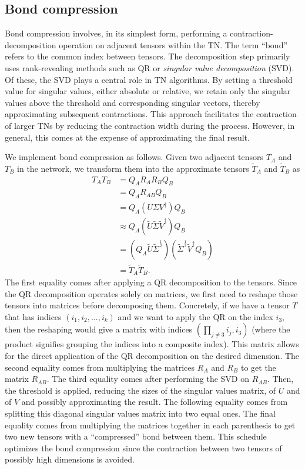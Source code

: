 \subsection{Bond compression}\label{Compression}
Bond compression involves, in its simplest form, performing a contraction-decomposition operation on adjacent tensors within the TN.
The term ``bond'' refers to the common index between tensors.
The decomposition step primarily uses rank-revealing methods such as QR or \textit{singular value decomposition} (SVD).
Of these, the SVD plays a central role in TN algorithms.
By setting a threshold value for singular values, either absolute or relative, we retain only the singular values above the threshold and corresponding singular vectors, thereby approximating subsequent contractions.
This approach facilitates the contraction of larger TNs by reducing the contraction width during the process.
However, in general, this comes at the expense of approximating the final result.

We implement bond compression as follows.
Given two adjacent tensors $T_A$ and $T_B$ in the network, we transform them into the approximate tensors $\tilde{T}_A$ and $\tilde{T}_B$ as
\begin{equation}\label{eq:compression_schedule}
    \begin{split}
        T_AT_B &= Q_AR_AR_BQ_B\\
        &= Q_AR_{AB}Q_B\\
        &= Q_A(U\Sigma V^\dagger)Q_B\\
        &\approx Q_A(\tilde{U}\tilde{\Sigma} \tilde{V}^\dagger)Q_B\\
        &= (Q_A\tilde{U}\tilde{\Sigma}^\frac{1}{2})(\tilde{\Sigma}^\frac{1}{2}\tilde{V}^\dagger Q_B)\\
        &= \tilde{T}_A\tilde{T}_B.
    \end{split}
\end{equation}
The first equality comes after applying a QR decomposition to the tensors.
Since the QR decomposition operates solely on matrices, we first need to reshape those tensors into matrices before decomposing them.
Concretely, if we have a tensor $T$ that has indices $(i_1, i_2, ..., i_k)$ and we want to apply the QR on the index $i_3$, then the reshaping would give a matrix with indices $(\prod_{j \neq 3}i_j, i_3)$ (where the product signifies grouping the indices into a composite index).
This matrix allows for the direct application of the QR decomposition on the desired dimension.
The second equality comes from multiplying the matrices $R_A$ and $R_B$ to get the matrix $R_{AB}$.
The third equality comes after performing the SVD on $R_{AB}$.
Then, the threshold is applied, reducing the sizes of the singular values matrix, of $U$ and of $V$ and possibly approximating the result.
The following equality comes from splitting this diagonal singular values matrix into two equal ones.
The final equality comes from multiplying the matrices together in each parenthesis to get two new tensors with a ``compressed'' bond between them.
This schedule optimizes the bond compression since the contraction between two tensors of possibly high dimensions is avoided.

